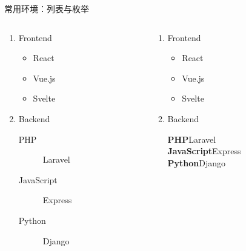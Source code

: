 \begin{frame}[fragile]{常用环境：列表与枚举}
\begin{columns}
\begin{column}{0.54\textwidth}
  \begin{texcode}[gobble=4, emph={[1]enumerate,itemize}]
    \begin{enumerate}
      \item Frontend
        \begin{itemize}
          \item React
          \item Vue.js
          \item Svelte
        \end{itemize}
      \item Backend
        \begin{description}
          \item[PHP] Laravel
          \item[JavaScript] Express
          \item[Python] Django
        \end{description}
    \end{enumerate}
  \end{texcode}
\end{column}
\pause
\begin{column}{0.38\textwidth}
  \begin{enumerate}
    \item Frontend
      \begin{itemize}
        \item React
        \item Vue.js
        \item Svelte
      \end{itemize}
    \item Backend \par
        \vspace{0.5ex}\small
        \textbf{PHP}\enspace Laravel \\
        \textbf{JavaScript}\enspace Express \\
        \textbf{Python}\enspace Django
  \end{enumerate}
\end{column}
\end{columns}
\end{frame}


